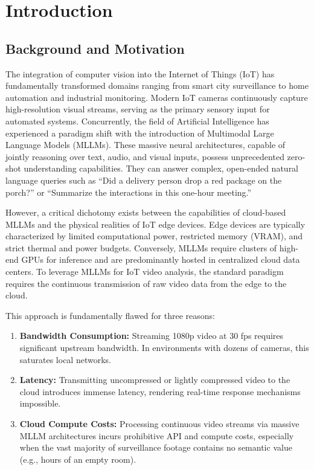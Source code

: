 \documentclass[12pt, a4paper]{report}
\begin{document}
\chapter{Introduction}

\section{Background and Motivation}
The integration of computer vision into the Internet of Things (IoT) has fundamentally transformed domains ranging from smart city surveillance to home automation and industrial monitoring. Modern IoT cameras continuously capture high-resolution visual streams, serving as the primary sensory input for automated systems. Concurrently, the field of Artificial Intelligence has experienced a paradigm shift with the introduction of Multimodal Large Language Models (MLLMs). These massive neural architectures, capable of jointly reasoning over text, audio, and visual inputs, possess unprecedented zero-shot understanding capabilities. They can answer complex, open-ended natural language queries such as ``Did a delivery person drop a red package on the porch?'' or ``Summarize the interactions in this one-hour meeting.''

However, a critical dichotomy exists between the capabilities of cloud-based MLLMs and the physical realities of IoT edge devices. Edge devices are typically characterized by limited computational power, restricted memory (VRAM), and strict thermal and power budgets. Conversely, MLLMs require clusters of high-end GPUs for inference and are predominantly hosted in centralized cloud data centers. To leverage MLLMs for IoT video analysis, the standard paradigm requires the continuous transmission of raw video data from the edge to the cloud. 

This approach is fundamentally flawed for three reasons:
\begin{enumerate}
    \item \textbf{Bandwidth Consumption:} Streaming 1080p video at 30 fps requires significant upstream bandwidth. In environments with dozens of cameras, this saturates local networks.
    \item \textbf{Latency:} Transmitting uncompressed or lightly compressed video to the cloud introduces immense latency, rendering real-time response mechanisms impossible.
    \item \textbf{Cloud Compute Costs:} Processing continuous video streams via massive MLLM architectures incurs prohibitive API and compute costs, especially when the vast majority of surveillance footage contains no semantic value (e.g., hours of an empty room).
\end{enumerate}
\end{document}
